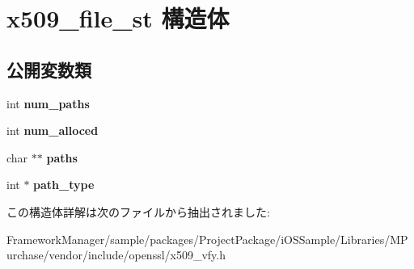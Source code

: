 \hypertarget{structx509__file__st}{}\section{x509\+\_\+file\+\_\+st 構造体}
\label{structx509__file__st}
\subsection*{公開変数類}
\begin{DoxyCompactItemize}
\item 
\hypertarget{structx509__file__st_a625533740392eada26b9522bfc5f563f}{}int {\bfseries num\+\_\+paths}\label{structx509__file__st_a625533740392eada26b9522bfc5f563f}

\item 
\hypertarget{structx509__file__st_a74ca798c37b4f0c937d6392d1a06eb97}{}int {\bfseries num\+\_\+alloced}\label{structx509__file__st_a74ca798c37b4f0c937d6392d1a06eb97}

\item 
\hypertarget{structx509__file__st_aa90fe6de68309d7572b7516787bf235f}{}char $\ast$$\ast$ {\bfseries paths}\label{structx509__file__st_aa90fe6de68309d7572b7516787bf235f}

\item 
\hypertarget{structx509__file__st_a2ecd2de35656eb382770bcb7317cb3f4}{}int $\ast$ {\bfseries path\+\_\+type}\label{structx509__file__st_a2ecd2de35656eb382770bcb7317cb3f4}

\end{DoxyCompactItemize}


この構造体詳解は次のファイルから抽出されました\+:\begin{DoxyCompactItemize}
\item 
Framework\+Manager/sample/packages/\+Project\+Package/i\+O\+S\+Sample/\+Libraries/\+M\+Purchase/vendor/include/openssl/x509\+\_\+vfy.\+h\end{DoxyCompactItemize}
